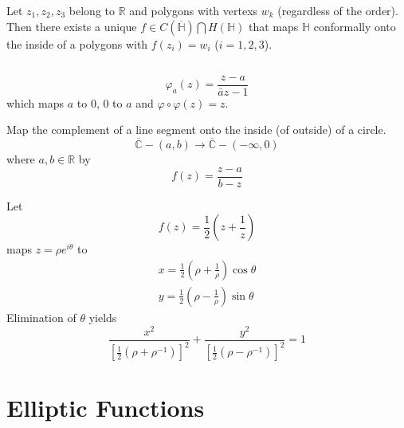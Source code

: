 \documentclass[12pt, oneside]{book}
\begin{document}
\begin{theorem}
    Let $z_1,z_2,z_3$ belong to $\mathbb{R}$ and polygons with vertexs $w_k$ (regardless of the order). Then there exists a unique $f\in C(\overline{\mathbb{H}})  \bigcap H(\mathbb{\mathbb{H}})$ that maps $\mathbb{H}$ conformally onto the inside of a polygons with $f(z_i)=w_{i}$ ($i=1,2,3$).
\end{theorem}

\section{}


\begin{theorem}[]
    \[\varphi_a(z) = \frac{z-a}{\bar{a}z-1}\]
    which maps $a$ to $0$, $0$ to $a$ and $\varphi\circ \varphi(z)=z$.
\end{theorem}


\begin{theorem}
    Map the complement of a line segment onto the inside (of outside) of a circle.
    \[\overline{\mathbb{C}}-(a,b)\longrightarrow\overline{\mathbb{C}}-(-\infty,0)\]
    where $a,b\in \mathbb{R}$ by
    \[f(z)=\frac{z-a}{b-z} \]
\end{theorem}
\begin{theorem}
    Let
    \[f(z)=\frac{1}{2}\left(z+\frac{1}{z}\right)\]
    maps $z=\rho e^{i\theta}$ to
    \[
        \begin{aligned}
            x=\frac{1}{2}\left(\rho +\frac{1}{\rho}\right)\cos\theta \\
            y=\frac{1}{2}\left(\rho -\frac{1}{\rho}\right)\sin\theta
        \end{aligned}\]
    Elimination of $\theta$ yields
    \[
        \frac{x^2}{\left[\frac{1}{2}(\rho +\rho^{-1})\right]^2}    +
        \frac{y^2}{\left[\frac{1}{2}(\rho -\rho^{-1})\right]^2}
        =1
    \]
\end{theorem}





\chapter{Elliptic Functions}
\end{document}
